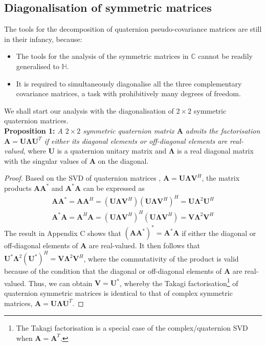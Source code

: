 \documentclass[review]{elsarticle}
\theoremstyle{plain}
\theoremstyle{remark}
\theoremstyle{plain}
\theoremstyle{definition}
\theoremstyle{prop}
\theoremstyle{definition}
\theoremstyle{plain}
\theoremstyle{plain}
\begin{document}
\subsection{Diagonalisation of symmetric matrices}
The tools for the decomposition of quaternion pseudo-covariance matrices are still in their infancy, because:
\begin{itemize}
\item The tools for the analysis of the symmetric matrices in $\mathbb{C}$ cannot be readily generalised to $\mathbb{H}$. 
\item It is required to simultaneously diagonalise all the three complementary covariance matrices, a task with prohibitively many degrees of freedom. 
\end{itemize}
We shall start our analysis with the diagonalisation of $2 \times 2$ symmetric quaternion matrices.
\\\textbf{Proposition 1:} \emph{A $2 \times 2$ symmetric quaternion matrix
$\mathbf{A}$ admits the factorisation $\mathbf{A}=\mathbf{U}\boldsymbol{\Lambda}\mathbf{U}^T$ if either its diagonal elements or off-diagonal elements are real-valued},
where $\mathbf{U}$ is a quaternion unitary matrix and $\boldsymbol{\Lambda}$ is a real diagonal matrix with the singular values of $\mathbf{A}$ on the diagonal.
\begin{proof}
Based on the SVD of quaternion matrices \cite{Zhang1997}, $\mathbf{A}=\mathbf{U}\boldsymbol{\Lambda}\mathbf{V}^H$, the matrix
products $\mathbf{AA}^*$ and $\mathbf{A}^*\mathbf{A}$ can be expressed as
\begin{equation*}
\begin{split}
\mathbf{AA}^*=\mathbf{AA}^{H}=(\mathbf{U}\boldsymbol{\Lambda}\mathbf{V}^H) (\mathbf{U}\boldsymbol{\Lambda}\mathbf{V}^H)^{H}=\mathbf{U}\boldsymbol{\Lambda}^2 \mathbf{U}^{H}
\\
\mathbf{A}^*\mathbf{A}=\mathbf{A}^{H}\mathbf{A}=(\mathbf{U}\boldsymbol{\Lambda}\mathbf{V}^H)^H (\mathbf{U}\boldsymbol{\Lambda}\mathbf{V}^H)=\mathbf{V}\boldsymbol{\Lambda}^2 \mathbf{V}^{H}
\end{split}
\end{equation*}
The result in Appendix C shows that $(\mathbf{AA^*})^*=\mathbf{A}^*\mathbf{A}$ if either the diagonal or off-diagonal elements of $\mathbf{A}$ are real-valued. It then follows that $\mathbf{U}^*\boldsymbol{\Lambda}^2 (\mathbf{U}^*)^{H}=\mathbf{V}\boldsymbol{\Lambda}^2 \mathbf{V}^{H}$, where the commutativity of the product is valid because of the condition that the diagonal or off-diagonal elements of $\mathbf{A}$ are real-valued. Thus, we can obtain $\mathbf{V}=\mathbf{U}^*$, 
whereby the Takagi factorisation\footnote{The Takagi factorisation is a special case of the complex/quaternion SVD when $\mathbf{A}=\mathbf{A}^T$.} of quaternion symmetric matrices is identical to that of complex symmetric matrices, $\mathbf{A}=\mathbf{U}\boldsymbol{\Lambda}\mathbf{U}^T$.
\end{proof}
\end{document}
